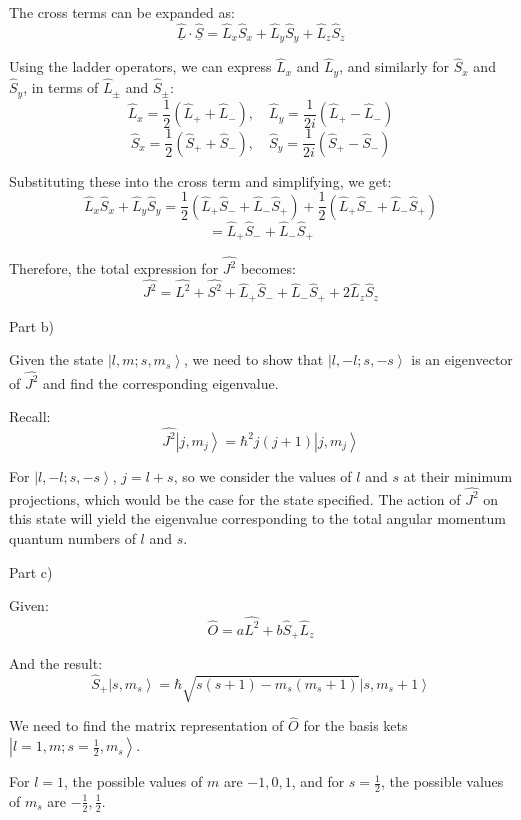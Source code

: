 \documentclass[a4paper,11pt]{article}
\begin{document}
The cross terms can be expanded as:
\[ \hat{\underline{L}}\cdot\hat{\underline{S}} = \hat{L}_{x}\hat{S}_{x} + \hat{L}_{y}\hat{S}_{y} + \hat{L}_{z}\hat{S}_{z} \]

Using the ladder operators, we can express \(\hat{L}_{x}\) and \(\hat{L}_{y}\), and similarly for \(\hat{S}_{x}\) and \(\hat{S}_{y}\), in terms of \(\hat{L}_{\pm}\) and \(\hat{S}_{\pm}\):
\[ \hat{L}_{x} = \frac{1}{2}(\hat{L}_{+} + \hat{L}_{-}), \quad \hat{L}_{y} = \frac{1}{2i}(\hat{L}_{+} - \hat{L}_{-}) \]
\[ \hat{S}_{x} = \frac{1}{2}(\hat{S}_{+} + \hat{S}_{-}), \quad \hat{S}_{y} = \frac{1}{2i}(\hat{S}_{+} - \hat{S}_{-}) \]

Substituting these into the cross term and simplifying, we get:
\[ \hat{L}_{x}\hat{S}_{x} + \hat{L}_{y}\hat{S}_{y} = \frac{1}{2}(\hat{L}_{+}\hat{S}_{-} + \hat{L}_{-}\hat{S}_{+}) + \frac{1}{2}(\hat{L}_{+}\hat{S}_{-} + \hat{L}_{-}\hat{S}_{+}) \]
\[ = \hat{L}_{+}\hat{S}_{-} + \hat{L}_{-}\hat{S}_{+} \]

Therefore, the total expression for \(\hat{J^{2}}\) becomes:
\[ \hat{J^{2}} = \hat{L^{2}} + \hat{S^{2}} + \hat{L}_{+}\hat{S}_{-} + \hat{L}_{-}\hat{S}_{+} + 2\hat{L}_{z}\hat{S}_{z} \]

Part b)

Given the state \(\left|l, m; s, m_{s} \right>\), we need to show that \(\left|l, -l; s, -s \right>\) is an eigenvector of \(\hat{J^{2}}\) and find the corresponding eigenvalue.

Recall:
\[ \hat{J^{2}}\left|j, m_j\right> = \hbar^2 j(j+1)\left|j, m_j\right> \]

For \(\left|l, -l; s, -s \right>\), \(j = l + s\), so we consider the values of \(l\) and \(s\) at their minimum projections, which would be the case for the state specified. The action of \(\hat{J^2}\) on this state will yield the eigenvalue corresponding to the total angular momentum quantum numbers of \(l\) and \(s\).

Part c)

Given:
\[ \hat{O} = a\hat{L^{2}} + b\hat{S}_{+}\hat{L}_{z} \]

And the result:
\[ \hat{S}_{+} \left|s, m_{s} \right> = \hbar \sqrt{s(s+1) - m_{s}(m_{s}+1)} \left|s, m_{s}+1 \right> \]

We need to find the matrix representation of \(\hat{O}\) for the basis kets \(\left|l=1, m; s=\frac{1}{2}, m_{s} \right>\).

For \(l = 1\), the possible values of \(m\) are \(-1, 0, 1\), and for \(s = \frac{1}{2}\), the possible values of \(m_s\) are \(-\frac{1}{2}, \frac{1}{2}\).
\end{document}
